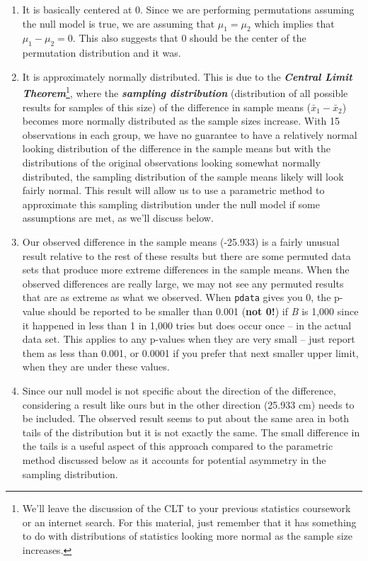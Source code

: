 \documentclass[
]{book}
\begin{document}
\begin{enumerate}
\def\labelenumi{\arabic{enumi}.}
\item
  It is basically centered at 0. Since we are performing permutations assuming
  the null model is true, we are assuming that \(\mu_1 = \mu_2\) which implies that
  \(\mu_1 - \mu_2 = 0\). This also suggests that 0 should be the center of the
  permutation distribution and it was.
\item
  It is approximately normally distributed. This is due to the \textbf{\emph{Central Limit Theorem}}\footnote{We'll leave the discussion of the CLT to your previous statistics coursework
    or an internet search. For this material, just remember that it has something to do with distributions of statistics
    looking more normal as the sample size increases.}, where the
  \textbf{\emph{sampling distribution}} (distribution of all possible results for samples
  of this size) of the difference in sample means (\(\bar{x}_1 - \bar{x}_2\)) becomes
  more normally distributed as the sample sizes increase. With 15
  observations in each group, we have no guarantee to have a relatively normal looking
  distribution of the difference in the sample means but with the distributions of the original observations looking somewhat normally distributed, the sampling distribution of the sample means likely will look fairly normal. This result will allow us to
  use a parametric
  method to approximate this sampling distribution under the null
  model if some assumptions are met, as we'll discuss below.
\item
  Our observed difference in the sample means (-25.933) is a fairly unusual
  result relative to the rest of these results but there are some permuted data
  sets that produce more extreme differences in the sample means. When the
  observed differences are really large, we may not see any permuted results
  that are as extreme as what we observed. When \texttt{pdata} gives you 0, the p-value
  should be reported to be smaller than 0.001 (\textbf{not 0!}) if \emph{B} is 1,000 since it happened
  in less than 1 in 1,000 tries but does occur once -- in the actual data set. This applies to any p-values when they are very small -- just report them as less than 0.001, or 0.0001 if you prefer that next smaller upper limit, when they are under these values.
\item
  Since our null model is not specific about the direction of the difference,
  considering a result like ours but in the other direction (25.933 cm) needs to
  be included. The observed result seems to put about the same area in both tails
  of the distribution but it is not exactly the same. The small difference in the
  tails is a useful aspect of this approach compared to the parametric method
  discussed below as it accounts for potential asymmetry in the sampling distribution.
\end{enumerate}
\end{document}
